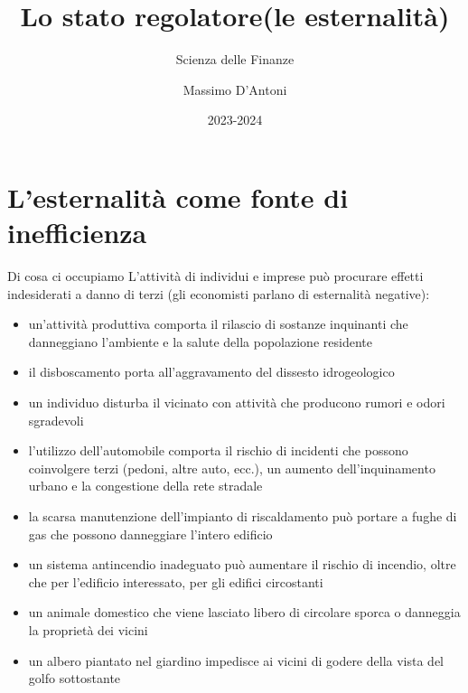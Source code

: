 \documentclass[aspectratio=64,11pt]{beamer}
\institute{Università di Siena}
\author{Massimo D'Antoni}
\date{2023-2024}
\title{Lo stato regolatore\newline (le esternalità)}
\subtitle{Scienza delle Finanze}
\begin{document}
\maketitle

\section{L'esternalità come fonte di inefficienza}

\begin{frame}{Di cosa ci occupiamo}
L'attività di individui e imprese può procurare \alert{effetti indesiderati a danno
di terzi} (gli economisti parlano di \alert{esternalità negative}):
\begin{itemize}
\item un’attività produttiva comporta il rilascio di sostanze inquinanti che
danneggiano l’ambiente e la salute della popolazione residente
\item il disboscamento porta all’aggravamento del dissesto idrogeologico
\item un individuo disturba il vicinato con attività che producono rumori e odori
sgradevoli
\item l’utilizzo dell’automobile comporta il rischio di incidenti che possono
coinvolgere terzi (pedoni, altre auto, ecc.), un aumento dell’inquinamento
urbano e la congestione della rete stradale
\item la scarsa manutenzione dell’impianto di riscaldamento può portare a fughe di
gas che possono danneggiare l’intero edificio
\item un sistema antincendio inadeguato può aumentare il rischio di incendio,
oltre che per l’edificio interessato, per gli edifici circostanti
\item un animale domestico che viene lasciato libero di circolare sporca o
danneggia la proprietà dei vicini
\item un albero piantato nel giardino impedisce ai vicini di godere della vista
del golfo sottostante
\end{itemize}
\end{frame}
\end{document}
